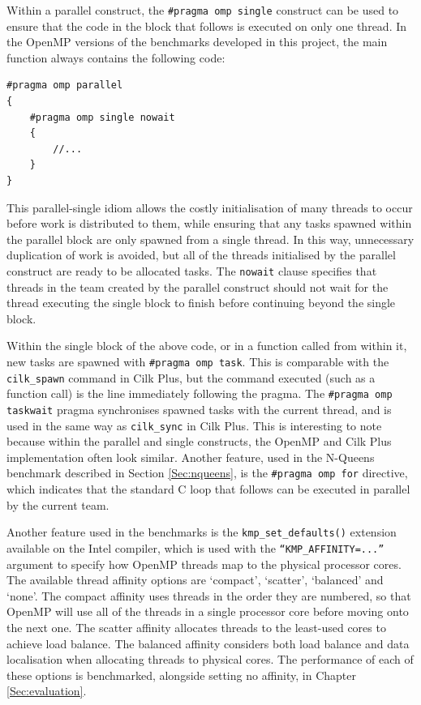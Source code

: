 \documentclass{report}
\newenvironment{mono}{\fontfamily{ttfamily}\selectfont}{\par}
\newenvironment{embedcode}{\begin{changemargin}{6em}{3em}\begin{mono}{}}{\end{mono}\end{changemargin}}
\begin{document}
Within a parallel construct, the \verb!#pragma omp single! construct can be used to ensure that the code in the block that follows is executed on only one thread. In the OpenMP versions of the benchmarks developed in this project, the main function always contains the following code:

\begin{embedcode}
\begin{verbatim}
#pragma omp parallel
{
    #pragma omp single nowait
    {
        //...
    }
}
\end{verbatim}
\end{embedcode}

This parallel-single idiom allows the costly initialisation of many threads to occur before work is distributed to them, while ensuring that any tasks spawned within the parallel block are only spawned from a single thread. In this way, unnecessary duplication of work is avoided, but all of the threads initialised by the parallel construct are ready to be allocated tasks. The \verb!nowait! clause specifies that threads in the team created by the parallel construct should not wait for the thread executing the single block to finish before continuing beyond the single block\cite{openmpspec}.

Within the single block of the above code, or in a function called from within it, new tasks are spawned with \verb!#pragma omp task!. This is comparable with the \verb!cilk_spawn! command in Cilk Plus, but the command executed (such as a function call) is the line immediately following the pragma. The \verb!#pragma omp taskwait! pragma synchronises spawned tasks with the current thread, and is used in the same way as \verb!cilk_sync! in Cilk Plus. This is interesting to note because within the parallel and single constructs, the OpenMP and Cilk Plus implementation often look similar. Another feature, used in the N-Queens benchmark described in Section \ref{Sec:nqueens}, is the \verb!#pragma omp for! directive, which indicates that the standard C loop that follows can be executed in parallel by the current team.

Another feature used in the benchmarks is the \verb!kmp_set_defaults()! extension available on the Intel compiler, which is used with the \verb!“KMP_AFFINITY=...”! argument to specify how OpenMP threads map to the physical processor cores\cite{openmpaffinity}. The available thread affinity options are `compact', `scatter', `balanced' and `none'\cite{Wang14}. The compact affinity uses threads in the order they are numbered, so that OpenMP will use all of the threads in a single processor core before moving onto the next one\cite{Wang14}. The scatter affinity allocates threads to the least-used cores to achieve load balance\cite{Wang14}. The balanced affinity considers both load balance and data localisation when allocating threads to physical cores\cite{Wang14}. The performance of each of these options is benchmarked, alongside setting no affinity, in Chapter \ref{Sec:evaluation}.
\end{document}
